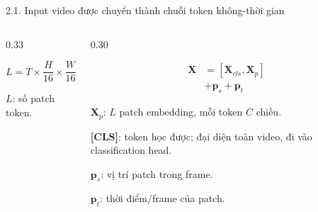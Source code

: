\documentclass[aspectratio=169,9pt]{beamer}
\begin{document}
\begin{frame}{2.1. Input video được chuyển thành chuỗi token không-thời gian}
\begin{columns}[T,onlytextwidth]
\begin{column}{0.33\textwidth}
\begin{tcolorbox}[titlepanel,title=2. Patchify và $L$, equal height group=s2]
\[        \]
        \[
          L=T\times\frac{H}{16}\times\frac{W}{16}
        \]
        \raggedright
        \textbf{$L$}: số patch token.
      \end{tcolorbox}
    \end{column}
    \begin{column}{0.30\textwidth}
      \begin{tcolorbox}[titlepanel,title=3. Chuỗi đưa vào encoder, equal height group=s2]
        \centering
        {\fontsize{7.0}{8.25}\selectfont
        \[
          \begin{aligned}
            \mathbf X&=[\mathbf X_{cls},\mathbf X_p]\\[-0.04cm]
                     &+\mathbf p_s+\mathbf p_t
          \end{aligned}
        \]
        \raggedright
        $\mathbf X_p$: $L$ patch embedding, mỗi token $C$ chiều.\par
        \textbf{[CLS]}: token học được; đại diện toàn video, đi vào classification head.\par
        $\mathbf p_s$: vị trí patch trong frame.\par
        $\mathbf p_t$: thời điểm/frame của patch.}
      \end{tcolorbox}
    \end{column}
  \end{columns}
\end{frame}
\end{document}
